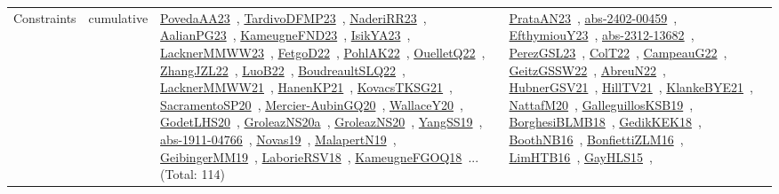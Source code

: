 {\begin{longtable}{lp{3cm}>{\raggedright\arraybackslash}p{6cm}>{\raggedright\arraybackslash}p{6cm}>{\raggedright\arraybackslash}p{8cm}}
Constraints & cumulative & \href{papers/PovedaAA23.pdf}{PovedaAA23}~\cite{PovedaAA23}, \href{papers/TardivoDFMP23.pdf}{TardivoDFMP23}~\cite{TardivoDFMP23}, \href{articles/NaderiRR23.pdf}{NaderiRR23}~\cite{NaderiRR23}, \href{papers/AalianPG23.pdf}{AalianPG23}~\cite{AalianPG23}, \href{papers/KameugneFND23.pdf}{KameugneFND23}~\cite{KameugneFND23}, \href{articles/IsikYA23.pdf}{IsikYA23}~\cite{IsikYA23}, \href{articles/LacknerMMWW23.pdf}{LacknerMMWW23}~\cite{LacknerMMWW23}, \href{articles/FetgoD22.pdf}{FetgoD22}~\cite{FetgoD22}, \href{articles/PohlAK22.pdf}{PohlAK22}~\cite{PohlAK22}, \href{papers/OuelletQ22.pdf}{OuelletQ22}~\cite{OuelletQ22}, \href{papers/ZhangJZL22.pdf}{ZhangJZL22}~\cite{ZhangJZL22}, \href{papers/LuoB22.pdf}{LuoB22}~\cite{LuoB22}, \href{papers/BoudreaultSLQ22.pdf}{BoudreaultSLQ22}~\cite{BoudreaultSLQ22}, \href{papers/LacknerMMWW21.pdf}{LacknerMMWW21}~\cite{LacknerMMWW21}, \href{papers/HanenKP21.pdf}{HanenKP21}~\cite{HanenKP21}, \href{papers/KovacsTKSG21.pdf}{KovacsTKSG21}~\cite{KovacsTKSG21}, \href{articles/SacramentoSP20.pdf}{SacramentoSP20}~\cite{SacramentoSP20}, \href{papers/Mercier-AubinGQ20.pdf}{Mercier-AubinGQ20}~\cite{Mercier-AubinGQ20}, \href{articles/WallaceY20.pdf}{WallaceY20}~\cite{WallaceY20}, \href{papers/GodetLHS20.pdf}{GodetLHS20}~\cite{GodetLHS20}, \href{papers/GroleazNS20a.pdf}{GroleazNS20a}~\cite{GroleazNS20a}, \href{papers/GroleazNS20.pdf}{GroleazNS20}~\cite{GroleazNS20}, \href{papers/YangSS19.pdf}{YangSS19}~\cite{YangSS19}, \href{articles/abs-1911-04766.pdf}{abs-1911-04766}~\cite{abs-1911-04766}, \href{articles/Novas19.pdf}{Novas19}~\cite{Novas19}, \href{papers/MalapertN19.pdf}{MalapertN19}~\cite{MalapertN19}, \href{papers/GeibingerMM19.pdf}{GeibingerMM19}~\cite{GeibingerMM19}, \href{articles/LaborieRSV18.pdf}{LaborieRSV18}~\cite{LaborieRSV18}, \href{papers/KameugneFGOQ18.pdf}{KameugneFGOQ18}~\cite{KameugneFGOQ18}... (Total: 114) & \href{articles/PrataAN23.pdf}{PrataAN23}~\cite{PrataAN23}, \href{articles/abs-2402-00459.pdf}{abs-2402-00459}~\cite{abs-2402-00459}, \href{papers/EfthymiouY23.pdf}{EfthymiouY23}~\cite{EfthymiouY23}, \href{articles/abs-2312-13682.pdf}{abs-2312-13682}~\cite{abs-2312-13682}, \href{papers/PerezGSL23.pdf}{PerezGSL23}~\cite{PerezGSL23}, \href{articles/ColT22.pdf}{ColT22}~\cite{ColT22}, \href{articles/CampeauG22.pdf}{CampeauG22}~\cite{CampeauG22}, \href{papers/GeitzGSSW22.pdf}{GeitzGSSW22}~\cite{GeitzGSSW22}, \href{articles/AbreuN22.pdf}{AbreuN22}~\cite{AbreuN22}, \href{articles/HubnerGSV21.pdf}{HubnerGSV21}~\cite{HubnerGSV21}, \href{papers/HillTV21.pdf}{HillTV21}~\cite{HillTV21}, \href{papers/KlankeBYE21.pdf}{KlankeBYE21}~\cite{KlankeBYE21}, \href{papers/NattafM20.pdf}{NattafM20}~\cite{NattafM20}, \href{papers/GalleguillosKSB19.pdf}{GalleguillosKSB19}~\cite{GalleguillosKSB19}, \href{articles/BorghesiBLMB18.pdf}{BorghesiBLMB18}~\cite{BorghesiBLMB18}, \href{articles/GedikKEK18.pdf}{GedikKEK18}~\cite{GedikKEK18}, \href{papers/BoothNB16.pdf}{BoothNB16}~\cite{BoothNB16}, \href{papers/BonfiettiZLM16.pdf}{BonfiettiZLM16}~\cite{BonfiettiZLM16}, \href{papers/LimHTB16.pdf}{LimHTB16}~\cite{LimHTB16}, \href{papers/GayHLS15.pdf}{GayHLS15}~\cite{GayHLS15}, 
\end{longtable}}
